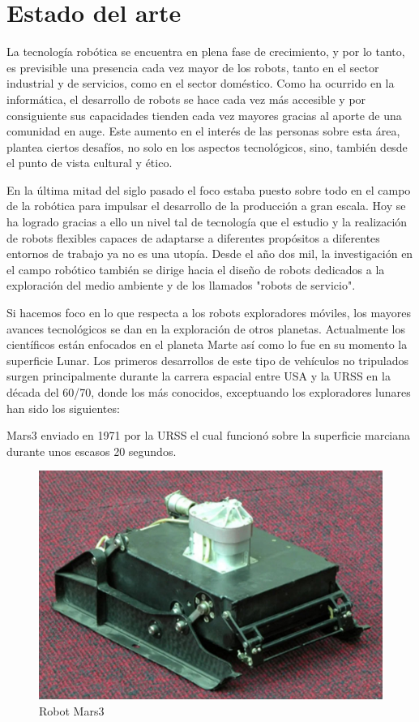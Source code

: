 \section{Estado del arte}

La tecnología robótica se encuentra en plena fase de crecimiento, y por lo tanto, es previsible una presencia cada vez mayor de los robots, tanto en el sector industrial y de servicios, como en el sector doméstico. Como ha ocurrido en la informática, el desarrollo de robots se hace cada vez más accesible y por consiguiente sus capacidades tienden cada vez mayores gracias al aporte de una comunidad en auge. Este aumento en el interés de las personas sobre esta área, plantea ciertos desafíos, no solo en los aspectos tecnológicos, sino, también desde el punto de vista cultural y ético.

En la última mitad del siglo pasado el foco estaba puesto sobre todo en el campo de la robótica para impulsar el desarrollo de la producción a gran escala. Hoy se ha logrado gracias a ello un nivel tal de tecnología que el estudio y la realización de robots flexibles capaces de adaptarse a diferentes propósitos a diferentes entornos de trabajo ya no es una utopía. Desde el año dos mil, la investigación en el campo robótico también se dirige hacia el diseño de robots dedicados a la exploración del medio ambiente y de los llamados "robots de servicio".

Si hacemos foco en lo que respecta a los robots exploradores móviles, los mayores avances tecnológicos se dan en la exploración de otros planetas. Actualmente los científicos están enfocados en el planeta Marte así como lo fue en su momento la superficie Lunar. Los primeros desarrollos de este tipo de vehículos no tripulados surgen principalmente durante la carrera espacial entre USA y la URSS en la década del 60/70, donde los más conocidos, exceptuando los exploradores lunares han sido los siguientes:

Mars3 enviado en 1971 por la URSS el cual funcionó sobre la superficie marciana durante unos escasos 20 segundos.

\begin{figure}[H]
    \centering
    \includegraphics[width=0.5\linewidth]{images/mars3.jpg}
    \caption{Robot Mars3}
    \label{fig:mars3}
\end{figure}

